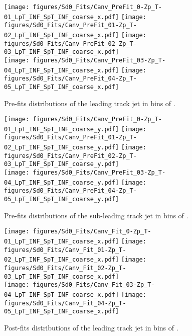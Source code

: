 \begin{figure}[htbp]
  \centering
 \texttt{[image: figures/Sd0\_Fits/Canv\_PreFit\_0-Zp\_T-01\_LpT\_INF\_SpT\_INF\_coarse\_x.pdf]}
 \texttt{[image: figures/Sd0\_Fits/Canv\_PreFit\_01-Zp\_T-02\_LpT\_INF\_SpT\_INF\_coarse\_x.pdf]}
 \texttt{[image: figures/Sd0\_Fits/Canv\_PreFit\_02-Zp\_T-03\_LpT\_INF\_SpT\_INF\_coarse\_x.pdf]}\\
 \texttt{[image: figures/Sd0\_Fits/Canv\_PreFit\_03-Zp\_T-04\_LpT\_INF\_SpT\_INF\_coarse\_x.pdf]}
 \texttt{[image: figures/Sd0\_Fits/Canv\_PreFit\_04-Zp\_T-05\_LpT\_INF\_SpT\_INF\_coarse\_x.pdf]}

\caption{Pre-fits \sdzero distributions of the leading track jet in bins of \zpt. }
  \label{fig:ZpT-prefits-leading-subsub}
\end{figure}


\begin{figure}[htbp]
  \centering
 \texttt{[image: figures/Sd0\_Fits/Canv\_PreFit\_0-Zp\_T-01\_LpT\_INF\_SpT\_INF\_coarse\_y.pdf]}
 \texttt{[image: figures/Sd0\_Fits/Canv\_PreFit\_01-Zp\_T-02\_LpT\_INF\_SpT\_INF\_coarse\_y.pdf]}
 \texttt{[image: figures/Sd0\_Fits/Canv\_PreFit\_02-Zp\_T-03\_LpT\_INF\_SpT\_INF\_coarse\_y.pdf]}\\
 \texttt{[image: figures/Sd0\_Fits/Canv\_PreFit\_03-Zp\_T-04\_LpT\_INF\_SpT\_INF\_coarse\_y.pdf]}
 \texttt{[image: figures/Sd0\_Fits/Canv\_PreFit\_04-Zp\_T-05\_LpT\_INF\_SpT\_INF\_coarse\_y.pdf]}

\caption{Pre-fits \sdzero distributions of the sub-leading track jet in bins of \zpt. }
  \label{fig:ZpT-prefits-subleading-subsub}
\end{figure}

\begin{figure}[htbp]
  \centering
 \texttt{[image: figures/Sd0\_Fits/Canv\_Fit\_0-Zp\_T-01\_LpT\_INF\_SpT\_INF\_coarse\_x.pdf]}
 \texttt{[image: figures/Sd0\_Fits/Canv\_Fit\_01-Zp\_T-02\_LpT\_INF\_SpT\_INF\_coarse\_x.pdf]}
 \texttt{[image: figures/Sd0\_Fits/Canv\_Fit\_02-Zp\_T-03\_LpT\_INF\_SpT\_INF\_coarse\_x.pdf]}\\
 \texttt{[image: figures/Sd0\_Fits/Canv\_Fit\_03-Zp\_T-04\_LpT\_INF\_SpT\_INF\_coarse\_x.pdf]}
 \texttt{[image: figures/Sd0\_Fits/Canv\_Fit\_04-Zp\_T-05\_LpT\_INF\_SpT\_INF\_coarse\_x.pdf]}


\caption{Post-fits \sdzero distributions of the leading track jet in bins of \zpt. }
  \label{fig:ZpT-postfits-leading-subsub}
\end{figure}


